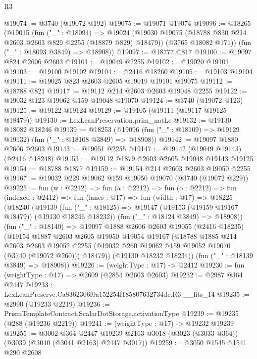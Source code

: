 \begin{lexlean}{R3}
\begin{coremodule}
@19074 := @3740 (@19072 @192)
@19075 := @19071 @19074
@19096 := @18265
    (@19015
      (fun ("_" : @18094) =>
      @19024
        (@19030 @19075 (@18788 @830 @214 @2603 @2603 @829 @2255 (@18879 @829) @18479))
        (@3765 @18082 @171))
      (fun ("_" : @18093 @3849) => @18908))
@19097 := @18777 @817
@19100 := @19097 @824 @2606 @2603
@19101 := @19049 @2255
@19102 := @19020 @19101
@19103 := @19100 @19102
@19104 := @2416 @18260
@19105 := @19103 @19104
@19111 := @19025 @823 @2603 @2605 @19019 @19101 @19075
@19112 := @18788 @821
@19117 := @19112 @214 @2603 @2603 @19048 @2255
@19122 := @19032 @123 @19062 @159 @19048 @19070
@19124 := @3740 (@19072 @123)
@19125 := @19122 @19124
@19129 := @19105 (@19111 (@19117 @19125 @18479))
@19130 := LexLeanPreservation.prim_natLe
@19132 := @19130 @18082 @18246
@19139 := @18253 (@19096 (fun ("_" : @18109) => @19129 @19132) (fun ("_" : @18108 @3849) => @18908))
@19142 := @19097 @1880 @2606 @2603
@19143 := @19051 @2255
@19147 := @19142 (@19049 @19143) (@2416 @18248)
@19153 := @19112 @1879 @2603 @2605 @19048 @19143 @19125
@19154 := @18788 @1877
@19159 := @19154 @214 @2603 @2603 @19050 @2255
@19167 := @19032 @229 @19062 @159 @19050 @19070 (@3740 (@19072 @229))
@19225 := fun (w : @2212) =>
  fun (a : @2212) =>
  fun (o : @2212) =>
  fun (indexed : @2412) =>
  fun (lanes : @17) =>
  fun (width : @17) =>
  @18225
    (@18240
      (@19139
        (fun ("_" : @18125) => @19147 (@19153 (@19159 @19167 @18479)) (@19130 @18246 @18232))
        (fun ("_" : @18124 @3849) => @18908))
      (fun ("_" : @18140) =>
      @19097
        @1888
        @2606
        @2603
        @19055
        (@2416 @18235)
        (@19154
          @1887
          @2603
          @2605
          @19050
          @19054
          @19167
          (@18788
            @1885
            @214
            @2603
            @2603
            @19052
            @2255
            (@19032 @260 @19062 @159 @19052 @19070 (@3740 (@19072 @260)))
            @18479))
        (@19130 @18232 @18234))
      (fun ("_" : @18139 @3849) => @18908))
@19226 := (weightType : @17) -> @2412
@19230 := fun (weightType : @17) => @2609 (@2854 @2603 @2603)
@19232 := @2987 @364 @2447
@19233 := LexLeanPreserve.Ca8362306f0a152254f185807632734dc.R3.__fits_14
@19235 := @2990 (@19233 @2219)
@19236 := PrismTemplateContract.ScalarDotStorage.activationType
@19239 := @19235 (@288 (@19236 @2219))
@19241 := (weightType : @17) -> @19232 @19239
@19255 := @3002
    @364
    @2447
    @19239
    @2163
    @3018
    (@3023 (@3033 @364))
    (@3039 (@3040 (@3041 @2163) @2447 @3017))
@19259 := @3050 @1545 @1541 @290 @2608

\end{coremodule}
\end{lexlean}

